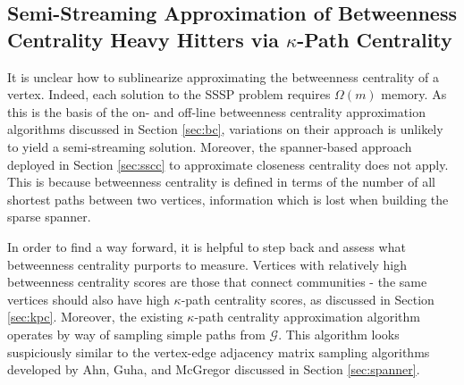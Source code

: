 \documentclass{report}
\newcommand{\algoname}[1]{\textnormal{\textsc{#1}}}
\begin{document}
\subsection{Semi-Streaming Approximation of Betweenness Centrality Heavy Hitters via $\kappa$-Path Centrality} \label{sec:sskpc}

It is unclear how to sublinearize approximating the betweenness centrality of a vertex.
Indeed, each solution to the \algoname{SSSP} problem requires $\Omega(m)$ memory.
As this is the basis of the on- and off-line  betweenness centrality approximation algorithms discussed in Section \ref{sec:bc}, variations on their approach is unlikely to yield a semi-streaming solution.
Moreover, the spanner-based approach deployed in Section \ref{sec:sscc} to approximate closeness centrality does not apply.
This is because betweenness centrality is defined in terms of the number of all shortest paths between two vertices, information which is lost when building the sparse spanner.




In order to find a way forward, it is helpful to step back and assess what betweenness centrality purports to measure.
Vertices with relatively high betweenness centrality scores are those that connect communities - the same vertices should also have high $\kappa$-path centrality scores, as discussed in Section \ref{sec:kpc}. 
Moreover, the existing $\kappa$-path centrality approximation algorithm operates by way of sampling simple paths from $\mathcal{G}$.
This algorithm looks suspiciously similar to the vertex-edge adjacency matrix sampling algorithms developed by Ahn, Guha, and McGregor discussed in Section \ref{sec:spanner}. 
\end{document}
